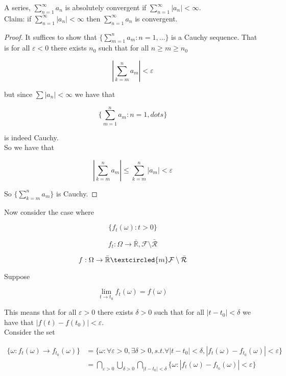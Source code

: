 \documentclass[11pt,fleqn]{book} %
\begin{document}
\begin{remark}
	A series, $\sum^\infty_{n=1} a_n$ is absolutely convergent if $\sum^\infty_{n=1} |a_n| < \infty$. \\

	Claim: if $\sum^\infty_{n=1} |a_n| < \infty$ then $\sum^\infty_{n=1} a_n$ is convergent. 

	\begin{proof}
		It suffices to show that $\{\sum^n_{m=1} a_m : n = 1, \dots \}$ is a Cauchy sequence. That is for all $\varepsilon < 0$ there exists $n_0$ such that for all $n \geq m \geq n_0$ 

				$$|\sum^n_{k=m} a_m| < \varepsilon $$

		but since $\sum |a_n| < \infty$ we have that 

				$$\{\sum^n_{m=1} a_m : n = 1, dots \} $$

		is indeed Cauchy. \\

		So we have that 

				$$|\sum^n_{k=m} a_m | \leq \sum^n_{k=m} |a_m| < \varepsilon  $$

		So $\{\sum^n_{k=m} a_m \}$ is Cauchy.
	\end{proof}
\end{remark}


Now consider the case where 

		$$\{f_t(\omega): t > 0 \} $$

		$$f_t: \Omega \rightarrow \mathbb{\bar{R}}, \mathcal{F} \setminus \mathcal{\bar{R}} $$

		$$f: \Omega \rightarrow \mathbb{\bar{R}} \textcircled{m}  \mathcal{F} \setminus \mathcal{\bar{R}}$$

Suppose 

		$$\lim_{t \rightarrow t_0} f_t (\omega) = f(\omega)  $$

This means that for all $\varepsilon > 0$ there exists $\delta > 0$ such that for all $|t - t_0| < \delta$ we have that $|f(t) - f(t_0) | < \varepsilon$. \\

Consider the set 

		\begin{align*}
			\{\omega: f_t(\omega) \rightarrow f_{t_0} (\omega) \} &= \{\omega: \forall \varepsilon > 0, \exists \delta > 0, s.t. \forall |t- t_0| < \delta, |f_t(\omega) - f_{t_0} (\omega)|< \varepsilon \}\\
					&= \bigcap_{\varepsilon >0} \bigcup_{\delta > 0} \bigcap_{|t - t_0|< \delta} \{\omega: |f_t (\omega) - f_{t_0}(\omega)| < \varepsilon \}
		\end{align*} 
\end{document}
